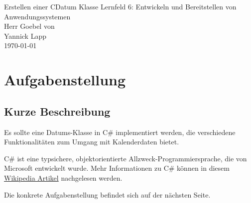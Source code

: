 \documentclass[12pt,pdftex,parskip=half]{scrartcl}
\begin{document}
\begin{titlepage}
    \begin{center}
        \vfill {{\Large Erstellen einer CDatum Klasse}}
        \vfill {Lernfeld 6: Entwickeln und Bereitstellen von Anwendungssystemen\\Herr Goebel}
        \vfill {von\\Yannick Lapp\\\today}
    \end{center}
\end{titlepage}


\tableofcontents
\clearpage


\section{Aufgabenstellung}

  \subsection{Kurze Beschreibung}
  Es sollte eine Datums-Klasse in C\# implementiert werden, die verschiedene Funktionalitäten zum Umgang mit Kalenderdaten bietet.

  C\# ist eine typsichere, objektorientierte Allzweck-Programmiersprache, die von Microsoft entwickelt wurde.
  Mehr Informationen zu C\# können in diesem \href{https://de.wikipedia.org/wiki/C-Sharp}{Wikipedia Artikel} nachgelesen werden.

  Die konkrete Aufgabenstellung befindet sich auf der nächsten Seite.

  \clearpage


\end{document}
